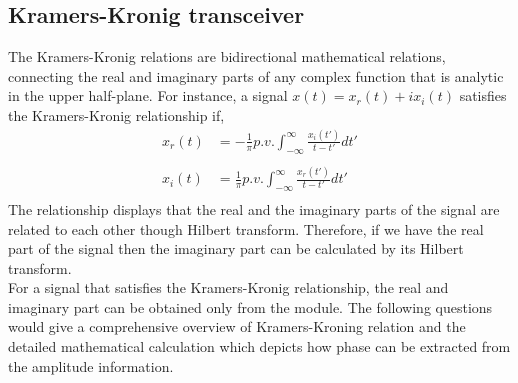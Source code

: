 \subsection{Kramers-Kronig transceiver}
The Kramers-Kronig relations are bidirectional mathematical relations, connecting the real and imaginary parts of any complex function that is analytic in the upper half-plane. For instance, a signal $x(t)=x_r(t) + i x_i(t)$ satisfies the Kramers-Kronig relationship if,
\begin{equation*}
\begin{split}
x_{r}(t) &=-\frac{1}{\pi} p.v. \int_{-\infty}^{\infty} \frac{x_{i}(t')}{t-t'} dt' \\ \\
x_{i}(t) &=\frac{1}{\pi} p.v. \int_{-\infty}^{\infty} \frac{x_{r}(t')}{t-t'} dt' \\
\end{split}
\label{KK}
\end{equation*}
The relationship displays that the real and the imaginary parts of the signal are related to each other though Hilbert transform. Therefore, if we have the real part of the signal then the imaginary part can be calculated by its Hilbert transform. \\For a signal that satisfies the Kramers-Kronig relationship, the real and imaginary part can be obtained only from the module. The following questions would give a comprehensive overview of Kramers-Kroning relation and the detailed mathematical calculation which depicts how phase can be extracted from the amplitude information.

